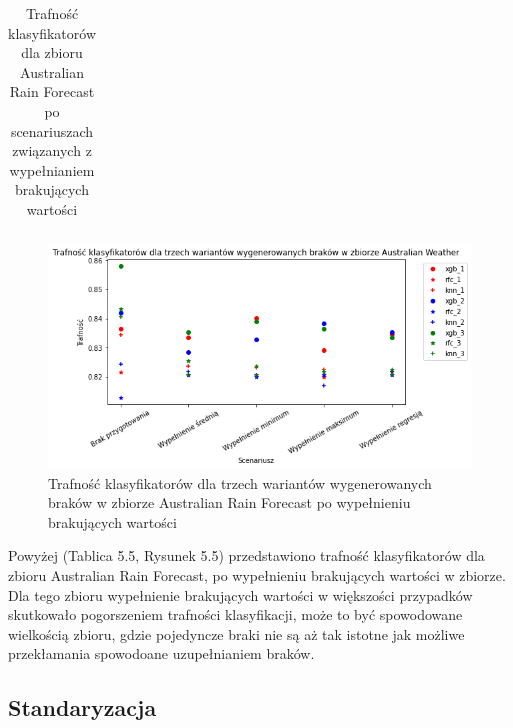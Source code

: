 \documentclass{book}
\begin{document}
\begin{table}[H]
\begin{tabular}{|l|l|r|r|r|r|r|}
    \end{tabular}
    \caption{Trafność klasyfikatorów dla zbioru Australian Rain Forecast po scenariuszach związanych z wypełnianiem brakujących wartości}
    \end{table}

    \begin{figure}[H]
        \centerline{\includegraphics[scale=0.8]{Aus_Weather_Wypełnienie_brakujących}}
        \centering
        \caption{Trafność klasyfikatorów dla trzech wariantów wygenerowanych braków w zbiorze Australian Rain Forecast po wypełnieniu brakujących wartości}
        \end{figure}


Powyżej (Tablica 5.5, Rysunek 5.5) przedstawiono 
trafność klasyfikatorów dla zbioru Australian Rain Forecast, 
po wypełnieniu brakujących wartości w zbiorze.
Dla tego zbioru wypełnienie brakujących wartości w większości
przypadków skutkowało pogorszeniem trafności klasyfikacji, może to 
być spowodowane wielkością zbioru, gdzie pojedyncze braki nie są 
aż tak istotne jak możliwe przekłamania spowodoane uzupełnianiem
braków.

\subsection{Standaryzacja}
\end{document}
